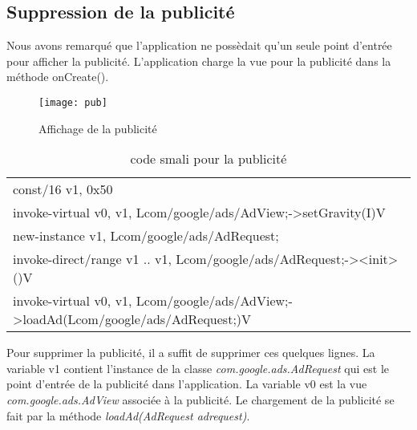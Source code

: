 
\subsection{Suppression de la publicité}
Nous avons remarqué que l'application ne possèdait qu'un seule point d'entrée pour afficher la publicité.
L'application charge la vue pour la publicité dans la méthode \hbox{onCreate()}.
\begin{figure}[hp]
	      \begin{center}
		\texttt{[image: pub]}
	      \end{center}
	\caption{Affichage de la publicité}
\end{figure}

\begin{table}[here]
    \begin{center}
	\begin{tabular}{l}
	const/16 v1, 0x50 \\[0.2cm]
	
	invoke-virtual {v0, v1}, Lcom/google/ads/AdView;->setGravity(I)V \\[0.2cm]

	new-instance v1, Lcom/google/ads/AdRequest; \\[0.2cm]

	invoke-direct/range {v1 .. v1}, Lcom/google/ads/AdRequest;-><init>()V \\[0.2cm]

	invoke-virtual {v0, v1}, Lcom/google/ads/AdView;->loadAd(Lcom/google/ads/AdRequest;)V \\
	\end{tabular}
    \end{center}
    \caption{\label{}code smali pour la publicité}
\end{table}

Pour supprimer la publicité, il a suffit de supprimer ces quelques lignes.
La variable v1 contient l'instance de la classe \textit{com.google.ads.AdRequest} qui est le point d'entrée de la publicité dans l'application.
La variable v0 est la vue \textit{com.google.ads.AdView} associée à la publicité. Le chargement de la publicité se fait par la méthode \textit{loadAd(AdRequest adrequest)}.

